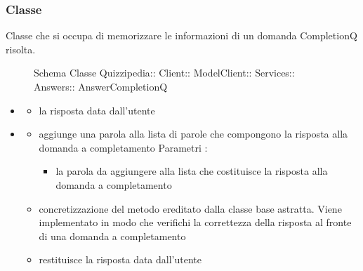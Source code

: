 \subsubsection{Classe }
Classe che si occupa di memorizzare le informazioni di un domanda CompletionQ risolta.
\begin{figure}[H]
\centering
\noindent{}
\caption[Schema Classe AnswerCompletionQ]{Schema Classe Quizzipedia:: Client:: ModelClient:: Services:: Answers:: AnswerCompletionQ}
\end{figure}
\begin{itemize}
\item {}
\begin{itemize}
\item {}
\newline
la risposta data dall'utente
\end{itemize}
\item {}
\begin{itemize}
\item {}
\newline
aggiunge una parola alla lista di parole che compongono la risposta alla domanda a completamento
\newline
Parametri :
\begin{itemize}
\item {}
\newline
la parola da aggiungere alla lista che costituisce la risposta alla domanda a completamento
\end{itemize}
\item {}
\newline
concretizzazione del metodo ereditato dalla classe base astratta. Viene implementato in modo che verifichi la correttezza della risposta al fronte di una domanda a completamento
\newline
\item {}
\newline
restituisce la risposta data dall'utente
\newline
\end{itemize}
\end{itemize}
